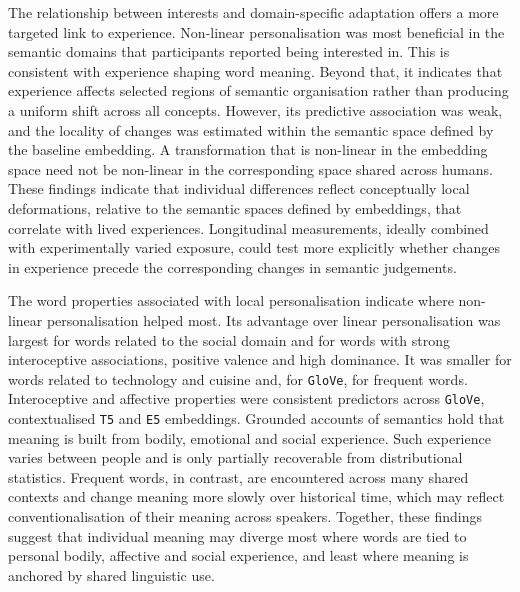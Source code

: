 \documentclass[pdflatex,sn-mathphys]{sn-jnl}
\begin{document}
The relationship between interests and domain-specific adaptation offers a more targeted link to experience. Non-linear personalisation was most beneficial in the semantic domains that participants reported being interested in. This is consistent with experience shaping word meaning\cite{Binder2011,Meteyard2012}. Beyond that, it indicates that experience affects selected regions of semantic organisation rather than producing a uniform shift across all concepts. However, its predictive association was weak, and the locality of changes was estimated within the semantic space defined by the baseline embedding. A transformation that is non-linear in the embedding space need not be non-linear in the corresponding space shared across humans. These findings indicate that individual differences reflect conceptually local deformations, relative to the semantic spaces defined by embeddings, that correlate with lived experiences. Longitudinal measurements, ideally combined with experimentally varied exposure, could test more explicitly whether changes in experience precede the corresponding changes in semantic judgements.

The word properties associated with local personalisation indicate where non-linear personalisation helped most. Its advantage over linear personalisation was largest for words related to the social domain and for words with strong interoceptive associations, positive valence and high dominance. It was smaller for words related to technology and cuisine and, for \texttt{GloVe}, for frequent words. Interoceptive and affective properties were consistent predictors across \texttt{GloVe}, contextualised \texttt{T5} and \texttt{E5} embeddings. Grounded accounts of semantics hold that meaning is built from bodily\cite{Barsalou2008,Connell2018}, emotional\cite{Kousta2011} and social experience\cite{Borghi2017}. Such experience varies between people\cite{Wang2021} and is only partially recoverable from distributional statistics\cite{Andrews2009}. Frequent words, in contrast, are encountered across many shared contexts and change meaning more slowly over historical time\cite{Hamilton2016}, which may reflect conventionalisation of their meaning across speakers\cite{Bybee2007}. Together, these findings suggest that individual meaning may diverge most where words are tied to personal bodily, affective and social experience, and least where meaning is anchored by shared linguistic use.
\end{document}
